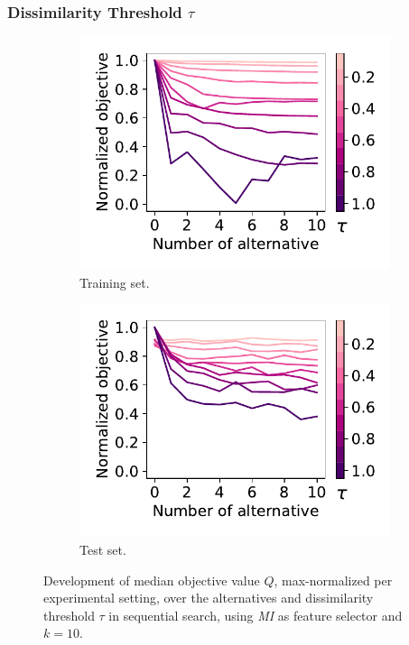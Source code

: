 \documentclass{article}
\theoremstyle{definition}
\begin{document}
\subsubsection{Dissimilarity Threshold $\tau$}

\begin{figure}[htb]
	\centering
	\begin{subfigure}{0.48\textwidth}
		\centering
		\includegraphics[width=\textwidth]{plots/impact-num-alternatives-train-objective-tau.pdf}
		\caption{Training set.}
		\label{fig:impact-num-alternatives-train-objective-tau}
	\end{subfigure}
	\hfill
	\begin{subfigure}{0.48\textwidth}
		\centering
		\includegraphics[width=\textwidth]{plots/impact-num-alternatives-test-objective-tau.pdf}
		\caption{Test set.}
		\label{fig:impact-num-alternatives-test-objective-tau}
	\end{subfigure}
	\caption{Development of median objective value $Q$, max-normalized per experimental setting, over the alternatives and dissimilarity threshold $\tau$ in sequential search, using \emph{MI} as feature selector and $k=10$.}
	\label{fig:impact-num-alternatives-objective-tau}
\end{figure}
\end{document}
